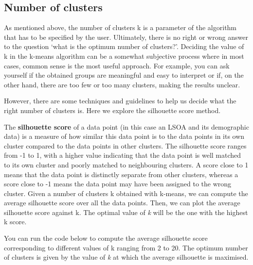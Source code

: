 \documentclass[
  letterpaper,
  DIV=11,
  numbers=noendperiod]{scrreprt}
\begin{document}
\hypertarget{number-of-clusters}{%
\subsection{Number of clusters}\label{number-of-clusters}}

As mentioned above, the number of clusters k is a parameter of the
algorithm that has to be specified by the user. Ultimately, there is no
right or wrong answer to the question `what is the optimum number of
clusters?'. Deciding the value of k in the k-means algorithm can be a
somewhat subjective process where in most cases, common sense is the
most useful approach. For example, you can ask yourself if the obtained
groups are meaningful and easy to interpret or if, on the other hand,
there are too few or too many clusters, making the results unclear.

However, there are some techniques and guidelines to help us decide what
the right number of clusters is. Here we explore the silhouette score
method.

The \textbf{silhouette score} of a data point (in this case an LSOA and
its demographic data) is a measure of how similar this data point is to
the data points in its own cluster compared to the data points in other
clusters. The silhouette score ranges from -1 to 1, with a higher value
indicating that the data point is well matched to its own cluster and
poorly matched to neighbouring clusters. A score close to 1 means that
the data point is distinctly separate from other clusters, whereas a
score close to -1 means the data point may have been assigned to the
wrong cluster. Given a number of clusters k obtained with k-means, we
can compute the average silhouette score over all the data points. Then,
we can plot the average silhouette score against k. The optimal value of
\emph{k} will be the one with the highest k score.

You can run the code below to compute the average silhouette score
corresponding to different values of k ranging from 2 to 20. The optimum
number of clusters is given by the value of \emph{k} at which the
average silhouette is maximised.
\end{document}
